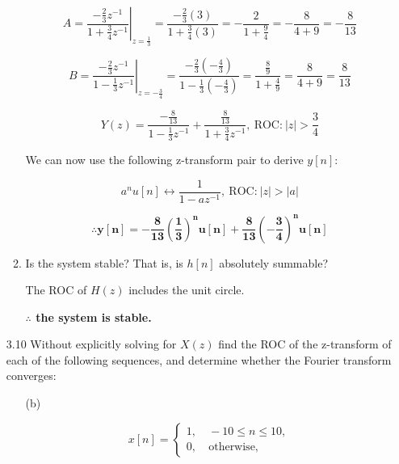 \documentclass[fleqn]{article}
\begin{document}
\begin{enumerate}[nolistsep]
\begin{enumerate}[nolistsep]
				\begin{equation*}
					A = \left.\frac{-\frac{2}{3}z^{-1}}{1 + \frac{3}{4}z^{-1}}\right\vert_{z = \frac{1}{3}} = \frac{-\frac{2}{3}(3)}{1 + \frac{3}{4}(3)} = -\frac{2}{1 + \frac{9}{4}} = -\frac{8}{4 + 9} = -\frac{8}{13}
				\end{equation*}
					
				\begin{equation*}
					B = \left.\frac{-\frac{2}{3}z^{-1}}{1 - \frac{1}{3}z^{-1}}\right\vert_{z = -\frac{3}{4}} = \frac{-\frac{2}{3}\left(-\frac{4}{3}\right)}{1 - \frac{1}{3}\left(-\frac{4}{3}\right)} = \frac{\frac{8}{9}}{1 + \frac{4}{9}} = \frac{8}{4 + 9} = \frac{8}{13}
				\end{equation*}
				
				\pagebreak
				\begin{equation*}
					Y(z) = \frac{-\frac{8}{13}}{1 - \frac{1}{3}z^{-1}} + \frac{\frac{8}{13}}{1 + \frac{3}{4}z^{-1}},\ \text{ROC:}\ |z| > \frac{3}{4}
				\end{equation*}
				
				We can now use the following z-transform pair to derive $y[n]$:
				
				\begin{equation*}
					a^nu[n] \leftrightarrow \frac{1}{1 - az^{-1}},\ \text{ROC:}\ |z| > |a| 
				\end{equation*}
				
				\begin{equation*}
					\mathbf{\therefore y[n] = -\frac{8}{13}\left(\frac{1}{3}\right)^nu[n] + \frac{8}{13}\left(-\frac{3}{4}\right)^nu[n]}
				\end{equation*}
				
				
			\item Is the system stable? That is, is $h[n]$ absolutely summable?
			
				The ROC of $H(z)$ includes the unit circle.
				
				\textbf{$\mathbf{\therefore}$ the system is stable.}
		\end{enumerate}
		
				
		\item [3.10] Without explicitly solving for $X(z)$ find the ROC of the z-transform of each of the following sequences, and determine whether the Fourier transform converges:
		
			\begin{enumerate}[nolistsep]
				\item [(b)]

					\begin{equation*}				
						x[n] = \left\{\begin{aligned} 1,& \ -10 \leq n \leq 10, \\ 
						0,& \ \text{otherwise}, \end{aligned}\right.
					\end{equation*}
					

\end{enumerate}
\end{enumerate}
\end{document}
